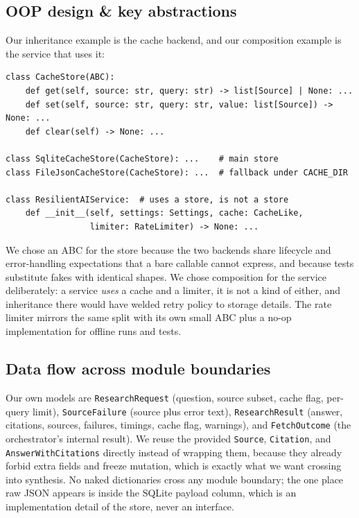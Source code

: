 \documentclass[11pt,a4paper]{article}
\begin{document}
\subsection{OOP design \& key abstractions}

Our inheritance example is the cache backend, and our composition example is the service that uses it:

\begin{lstlisting}[style=python]
class CacheStore(ABC):
    def get(self, source: str, query: str) -> list[Source] | None: ...
    def set(self, source: str, query: str, value: list[Source]) -> None: ...
    def clear(self) -> None: ...

class SqliteCacheStore(CacheStore): ...    # main store
class FileJsonCacheStore(CacheStore): ...  # fallback under CACHE_DIR

class ResilientAIService:  # uses a store, is not a store
    def __init__(self, settings: Settings, cache: CacheLike,
                 limiter: RateLimiter) -> None: ...
\end{lstlisting}

We chose an ABC for the store because the two backends share lifecycle and error-handling expectations that a bare callable cannot express, and because tests substitute fakes with identical shapes. We chose composition for the service deliberately: a service \emph{uses} a cache and a limiter, it is not a kind of either, and inheritance there would have welded retry policy to storage details. The rate limiter mirrors the same split with its own small ABC plus a no-op implementation for offline runs and tests.

\subsection{Data flow across module boundaries}

Our own models are \texttt{ResearchRequest} (question, source subset, cache flag, per-query limit), \texttt{SourceFailure} (source plus error text), \texttt{ResearchResult} (answer, citations, sources, failures, timings, cache flag, warnings), and \texttt{FetchOutcome} (the orchestrator's internal result). We reuse the provided \texttt{Source}, \texttt{Citation}, and \texttt{AnswerWithCitations} directly instead of wrapping them, because they already forbid extra fields and freeze mutation, which is exactly what we want crossing into synthesis. No naked dictionaries cross any module boundary; the one place raw JSON appears is inside the SQLite payload column, which is an implementation detail of the store, never an interface.
\end{document}
